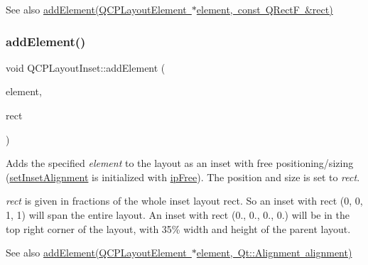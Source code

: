 \begin{DoxySeeAlso}{See also}
\mbox{\hyperlink{class_q_c_p_layout_inset_a8ff61fbee4a1f0ff45c398009d9f1e56}{add\+Element(\+Q\+C\+P\+Layout\+Element $\ast$element, const Q\+Rect\+F \&rect)}} 
\end{DoxySeeAlso}
\mbox{\label{class_q_c_p_layout_inset_a8ff61fbee4a1f0ff45c398009d9f1e56}} 
\subsubsection{\texorpdfstring{add\+Element()}{addElement()}\hspace{0.1cm}{\footnotesize\ttfamily [2/2]}}
{\footnotesize\ttfamily void Q\+C\+P\+Layout\+Inset\+::add\+Element (\begin{DoxyParamCaption}\item[{\mbox{\hyperlink{class_q_c_p_layout_element}{Q\+C\+P\+Layout\+Element}} $\ast$}]{element,  }\item[{const Q\+RectF \&}]{rect }\end{DoxyParamCaption})}

Adds the specified {\itshape element} to the layout as an inset with free positioning/sizing (\mbox{\hyperlink{class_q_c_p_layout_inset_a62882a4f9ad58bb0f53da12fde022abe}{set\+Inset\+Alignment}} is initialized with \mbox{\hyperlink{class_q_c_p_layout_inset_a8b9e17d9a2768293d2a7d72f5e298192aa4802986ea2cea457f932b115acba59e}{ip\+Free}}). The position and size is set to {\itshape rect}.

{\itshape rect} is given in fractions of the whole inset layout rect. So an inset with rect (0, 0, 1, 1) will span the entire layout. An inset with rect (0., 0., 0., 0.) will be in the top right corner of the layout, with 35\% width and height of the parent layout.

\begin{DoxySeeAlso}{See also}
\mbox{\hyperlink{class_q_c_p_layout_inset_ad61529eb576af7f04dff94abb10c745a}{add\+Element(\+Q\+C\+P\+Layout\+Element $\ast$element, Qt\+::\+Alignment alignment)}} 
\end{DoxySeeAlso}
\mbox{\label{class_q_c_p_layout_inset_a881ca205605bae9c034733b808f93a02}} 
